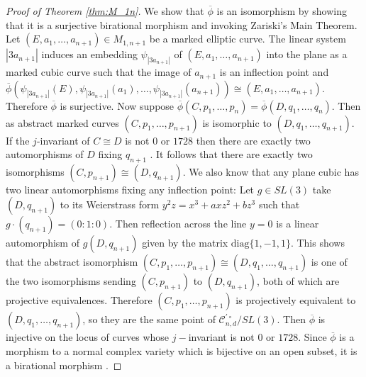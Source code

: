 \documentclass{amsart}
\newcommand{\mc}{\mathcal}
\newcommand{\diag}{\text{diag}}
\numberwithin{equation}{section}
\theoremstyle{definition}
\begin{document}
\begin{proof}[Proof of Theorem \ref{thm:M_1n}]
 We show that $\overline{\phi}$ is an isomorphism by showing that it is a surjective birational morphism and invoking Zariski's Main Theorem. Let $(E,a_1, \dots, a_{n+1}) \in M_{1,n+1}$ be a marked elliptic curve. The linear system $|3a_{n+1}|$ induces an embedding $\psi_{|3a_{n+1}|}$ of $(E,a_1, \dots, a_{n+1})$ into the plane as a marked cubic curve such that the image of $a_{n+1}$ is an inflection point and $\overline{\phi}(\psi_{|3a_{n+1}|}(E),\psi_{|3a_{n+1}|}(a_1), \dots, \psi_{|3a_{n+1}|}(a_{n+1})) \cong (E,a_1, \dots, a_{n+1}).$ Therefore $\overline{\phi}$ is surjective. Now suppose $\overline{\phi}(C,p_1, \dots , p_n) = \overline{\phi} (D, q_1, \dots , q_n).$ Then as abstract marked curves $(C,p_1, \dots , p_{n+1})$ is isomorphic to $ (D, q_1, \dots , q_{n+1})$. If the $j$-invariant of $C \cong D$ is not $0$ or $1728$ then there are exactly two automorphisms of $D$ fixing $q_{n+1}$ \cite[Corollary IV.4.7]{Hart77}. It follows that there are exactly two isomorphisms $(C,p_{n+1}) \cong (D,q_{n+1}).$ We also know that any plane cubic has two linear automorphisms fixing any inflection point: Let $g\in SL(3)$ take $(D,q_{n+1})$ to its Weierstrass form $y^2z = x^3 + axz^2 + bz^3$ such that $g \cdot (q_{n+1}) = (0:1:0).$ Then reflection across the line $y=0$ is a linear automorphism of $g(D,q_{n+1})$  given by the matrix $\diag \{1, -1, 1\}$. This shows that the abstract isomorphism $(C,p_1, \dots , p_{n+1}) \cong (D, q_1, \dots , q_{n+1})$ is one of the two isomorphisms sending $(C,p_{n+1})$ to $(D,q_{n+1})$, both of which are projective equivalences. Therefore $(C,p_1, \dots , p_{n+1})$ is projectively equivalent to $ (D, q_1, \dots , q_{n+1})$, so they are the same point of $\mc{C}_{n,d}^{' \circ} \slash SL(3).$ Then $\overline{\phi}$ is injective on the locus of curves whose $j-$invariant is not $0$ or $1728$. Since $\overline{\phi}$ is a morphism to a normal complex variety which is bijective on an open subset, it is a birational morphism \cite{Starrstack}.



\end{proof}
\end{document}
